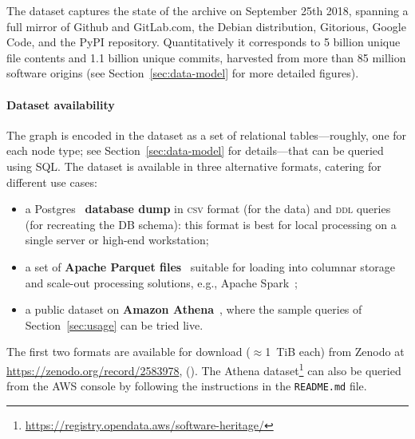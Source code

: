 The dataset captures the state of the \SWH{} archive on September 25th 2018,
spanning a full mirror of Github and GitLab.com, the Debian distribution,
Gitorious, Google Code, and the PyPI repository. Quantitatively it corresponds
to 5 billion unique file contents and 1.1 billion unique commits, harvested
from more than 85 million software origins (see Section~\ref{sec:data-model} for more
detailed figures).


\paragraph*{Dataset availability}

The \SWH{} graph is encoded in the dataset as a set of relational
tables---roughly, one for each node type; see Section~\ref{sec:data-model} for
details---that can be queried using \textsc{SQL}. The dataset is available in three
alternative formats, catering for different use cases:
\begin{itemize}

\item a Postgres~\cite{stonebraker1991postgres} \textbf{database dump} in \textsc{csv}
  format (for the data) and \textsc{ddl} queries (for recreating the DB schema): this
  format is best for local processing on a single server or high-end
  workstation;

\item a set of \textbf{Apache Parquet files}~\cite{website-apache-parquet}
  suitable for loading into columnar storage and scale-out processing
  solutions, e.g., Apache Spark~\cite{zaharia2016apache};

\item a public dataset on \textbf{Amazon Athena}~\cite{website-amazon-athena},
  where the sample queries of Section~\ref{sec:usage} can be tried live.

\end{itemize}

The first two formats are available for download ($\approx$1~TiB each) from
Zenodo at
\url{https://zenodo.org/record/2583978}, ().
The Athena dataset\footnote{\url{https://registry.opendata.aws/software-heritage/}} can also be
queried from the \textsc{AWS} console by following the instructions in the
\texttt{README.md} file.

